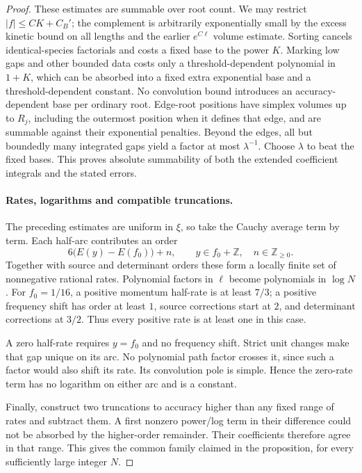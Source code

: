 \documentclass[11pt]{article}
\numberwithin{equation}{section}
\theoremstyle{definition}\newtheorem{definition}[theorem]{Definition}
\theoremstyle{remark}\newtheorem{remark}[theorem]{Remark}
\begin{document}
\begin{proof}
These estimates are summable over root count. We may restrict
\(|f|\le CK+C_B'\); the complement is arbitrarily exponentially small
by the excess kinetic bound on all lengths and the earlier
\(e^{C\ell}\) volume estimate. Sorting cancels identical-species
factorials and costs a fixed base to the power \(K\). Marking low gaps
and other bounded data costs only a threshold-dependent polynomial in
\(1+K\), which can be absorbed into a fixed extra exponential base and
a threshold-dependent constant. No convolution bound introduces an
accuracy-dependent base per ordinary root. Edge-root positions have
simplex volumes up to \(R_j\), including the outermost position when
it defines that edge, and are summable against their exponential
penalties. Beyond the edges, all but boundedly many integrated gaps
yield a factor at most \(\lambda^{-1}\). Choose \(\lambda\) to beat
the fixed bases. This proves absolute summability of both the extended
coefficient integrals and the stated errors.

\paragraph{Rates, logarithms and compatible truncations.}
The preceding estimates are uniform in \(\xi\), so take the Cauchy
average term by term. Each half-arc contributes an order
\[
 6\bigl(E(y)-E(f_0)\bigr)+n,
       \qquad y\in f_0+\mathbb Z,\quad n\in\mathbb Z_{\ge0}.
\]
Together with source and determinant orders these form a locally finite
set of nonnegative rational rates. Polynomial factors in \(\ell\)
become polynomials in \(\log N\). For \(f_0=1/16\), a positive
momentum half-rate is at least \(7/3\); a positive frequency shift has
order at least \(1\), source corrections start at \(2\), and
determinant corrections at \(3/2\). Thus every positive rate is at
least one in this case.

A zero half-rate requires \(y=f_0\) and no frequency shift. Strict
unit changes make that gap unique on its arc. No polynomial path
factor crosses it, since such a factor would also shift its rate.
Its convolution pole is simple. Hence the zero-rate term has no
logarithm on either arc and is a constant.

Finally, construct two truncations to accuracy higher than any fixed
range of rates and subtract them. A first nonzero power/log term in
their difference could not be absorbed by the higher-order remainder.
Their coefficients therefore agree in that range. This gives the
common family claimed in the proposition, for every sufficiently large
integer \(N\).
\end{proof}
\end{document}
